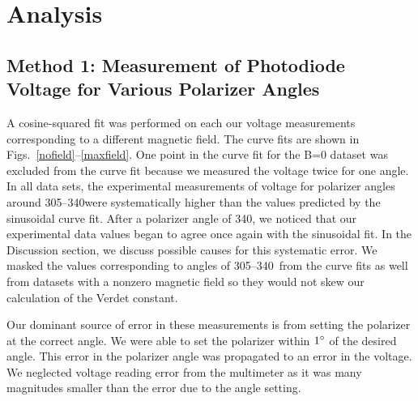 \documentclass[prb,preprint]{revtex4-1}
\begin{document}
\section{Analysis}
{\subsection{Method 1: Measurement of Photodiode Voltage for Various Polarizer Angles}
{A cosine-squared fit was performed on each our voltage measurements corresponding to a different magnetic field. The curve fits are shown in Figs.~\ref{nofield}--\ref{maxfield}.  One point in the curve fit for the B=0 dataset was excluded from the curve fit because we measured the voltage twice for one angle. In all data sets, the experimental measurements of voltage for polarizer angles around 305\degree--340\degree were systematically higher than the values predicted by the sinusoidal curve fit. After a polarizer angle of 340\degree, we noticed that our experimental data values began to agree once again with the sinusoidal fit.  In the Discussion section, we discuss possible causes for this systematic error. We masked the values corresponding to angles of 305\degree--340\degree\  from the curve fits as well from datasets with a nonzero magnetic field so they would not skew our calculation of the Verdet constant.

Our dominant source of error in these measurements is from setting the polarizer at the correct angle. We were able to set the polarizer within $1\degree$ of the desired angle. This error in the polarizer angle was propagated to an error in the voltage. We neglected voltage reading error from the multimeter as it was many magnitudes smaller than the error due to the angle setting.

}}
\end{document}
